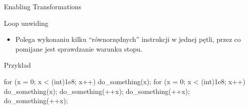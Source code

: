 \begin{frame}[fragile]{Enabling Transformations}
	\begin{block}{Loop unwiding} %
		\begin{itemize}
		 \item Polega wykonaniu kilku ``równorzędnych'' instrukcji w jednej pętli, przez co pomijane jest
		 sprawdzanie warunku stopu.
		\end{itemize}
	\end{block}
	\begin{block}{Przykład}
		\begin{cpp}
		for (x = 0; x < (int)1e8; x++)
		{
		    do_something(x);
		}
		for (x = 0; x < (int)1e8; x++)
		{
		    do_something(x);
		    do_something(++x);
		    do_something(++x);
		    do_something(++x);
		}
		\end{cpp}
	\end{block}
\end{frame}
